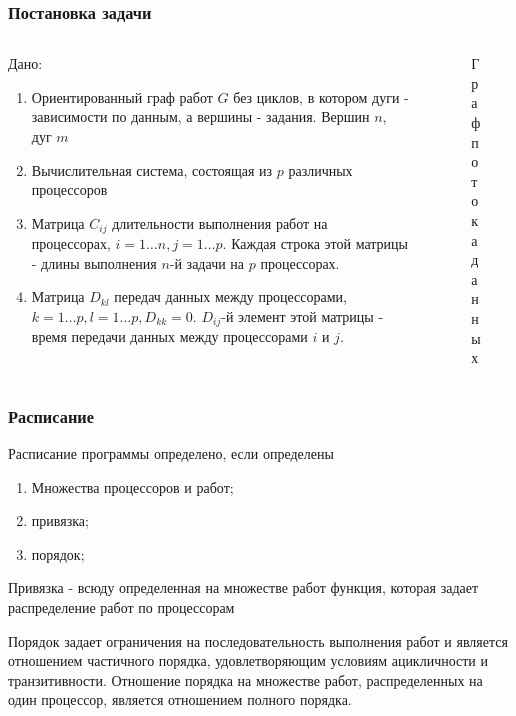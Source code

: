 \begin{frame}
    \frametitle{Постановка задачи}
    \begin{columns}
        \begin{column}{0.60\textwidth}
            Дано:
            \begin{enumerate}
                \item Ориентированный граф работ $G$ без циклов, в котором дуги - зависимости по данным, а вершины - задания. Вершин $n$, дуг $m$
                \item Вычислительная система, состоящая из $p$ различных процессоров
                \item Матрица $C_{ij}$ длительности выполнения работ на процессорах, $i=1 \dots n, j=1 \dots p$. Каждая строка этой матрицы - длины выполнения $n$-й задачи на $p$ процессорах. 
                \item Матрица $D_{kl}$ передач данных между процессорами, $k=1 \dots p, l = 1 \dots p, D_{kk} = 0$. $D_{ij}$-й элемент этой матрицы - время передачи данных между процессорами $i$ и $j$.
            \end{enumerate}
        \end{column}
        \begin{column}{0.40\textwidth}
            \begin{figure}
                \captionsetup{labelformat=empty}
                \caption{Граф потока данных}
            \end{figure}
        \end{column}
    \end{columns}
\end{frame}

\begin{frame}
    \frametitle{Расписание}
    Расписание программы определено, если определены
    \begin{enumerate}
        \item Множества процессоров и работ;
        \item привязка;
        \item порядок;
    \end{enumerate}
    \par
    Привязка - всюду определенная на множестве работ функция, которая задает распределение работ по процессорам
    \par
    Порядок задает ограничения на последовательность выполнения работ и является отношением частичного порядка, удовлетворяющим условиям ацикличности и транзитивности. Отношение порядка на множестве работ, распределенных на \\один процессор, является отношением полного порядка.
\end{frame}

